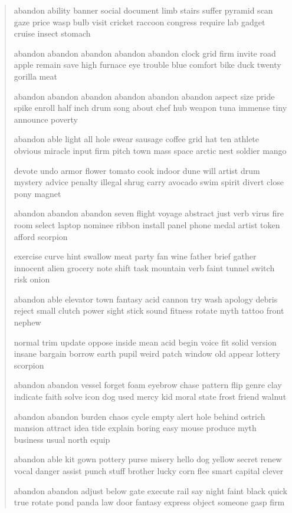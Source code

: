 \documentclass[a5paper, twoside]{book}
\begin{document}
\begin{verse}
 abandon ability banner social document limb stairs suffer pyramid scan gaze price wasp bulb visit cricket raccoon congress require lab gadget cruise insect stomach

 abandon abandon abandon abandon abandon clock grid firm invite road apple remain save high furnace eye trouble blue comfort bike duck twenty gorilla meat

 abandon abandon abandon abandon abandon abandon aspect size pride spike enroll half inch drum song about chef hub weapon tuna immense tiny announce poverty

 abandon able light all hole swear sausage coffee grid hat ten athlete obvious miracle input firm pitch town mass space arctic nest soldier mango

 devote undo armor flower tomato cook indoor dune will artist drum mystery advice penalty illegal shrug carry avocado swim spirit divert close pony magnet

 abandon abandon abandon seven flight voyage abstract just verb virus fire room select laptop nominee ribbon install panel phone medal artist token afford scorpion

 exercise curve hint swallow meat party fan wine father brief gather innocent alien grocery note shift task mountain verb faint tunnel switch risk onion

 abandon able elevator town fantasy acid cannon try wash apology debris reject small clutch power sight stick sound fitness rotate myth tattoo front nephew

 normal trim update oppose inside mean acid begin voice fit solid version insane bargain borrow earth pupil weird patch window old appear lottery scorpion

 abandon abandon vessel forget foam eyebrow chase pattern flip genre clay indicate faith solve icon dog used mercy kid moral state frost friend walnut

 abandon abandon burden chaos cycle empty alert hole behind ostrich mansion attract idea tide explain boring easy mouse produce myth business usual north equip

 abandon able kit gown pottery purse misery hello dog yellow secret renew vocal danger assist punch stuff brother lucky corn flee smart capital clever

 abandon abandon adjust below gate execute rail say night faint black quick true rotate pond panda law door fantasy express object someone gasp firm


\end{verse}
\end{document}
